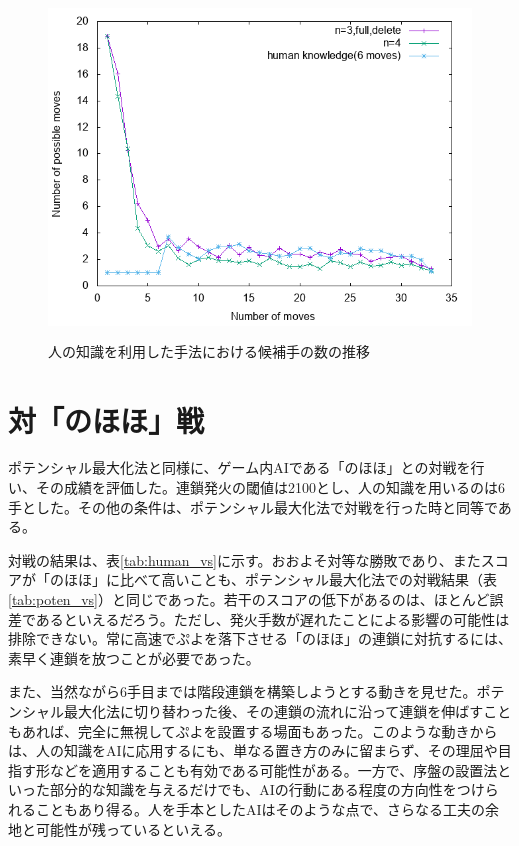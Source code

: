 \documentclass[12pt]{jreport}
\begin{document}
\begin{figure}[tbp]
  \begin{center}
  \includegraphics[height=9cm]{graph/HumanKnowledge/human_tsumoList.png}
  \caption{人の知識を利用した手法における候補手の数の推移} \label{fig:human_tsumoList}
\end{center}
\end{figure}


\section{対「のほほ」戦}
ポテンシャル最大化法と同様に、ゲーム内AIである「のほほ」との対戦を行い、その成績を評価した。連鎖発火の閾値は2100とし、人の知識を用いるのは6手とした。その他の条件は、ポテンシャル最大化法で対戦を行った時と同等である。

対戦の結果は、表\ref{tab:human_vs}に示す。おおよそ対等な勝敗であり、またスコアが「のほほ」に比べて高いことも、ポテンシャル最大化法での対戦結果（表\ref{tab:poten_vs}）と同じであった。若干のスコアの低下があるのは、ほとんど誤差であるといえるだろう。ただし、発火手数が遅れたことによる影響の可能性は排除できない。常に高速でぷよを落下させる「のほほ」の連鎖に対抗するには、素早く連鎖を放つことが必要であった。

また、当然ながら6手目までは階段連鎖を構築しようとする動きを見せた。ポテンシャル最大化法に切り替わった後、その連鎖の流れに沿って連鎖を伸ばすこともあれば、完全に無視してぷよを設置する場面もあった。このような動きからは、人の知識をAIに応用するにも、単なる置き方のみに留まらず、その理屈や目指す形などを適用することも有効である可能性がある。一方で、序盤の設置法といった部分的な知識を与えるだけでも、AIの行動にある程度の方向性をつけられることもあり得る。人を手本としたAIはそのような点で、さらなる工夫の余地と可能性が残っているといえる。
\end{document}
